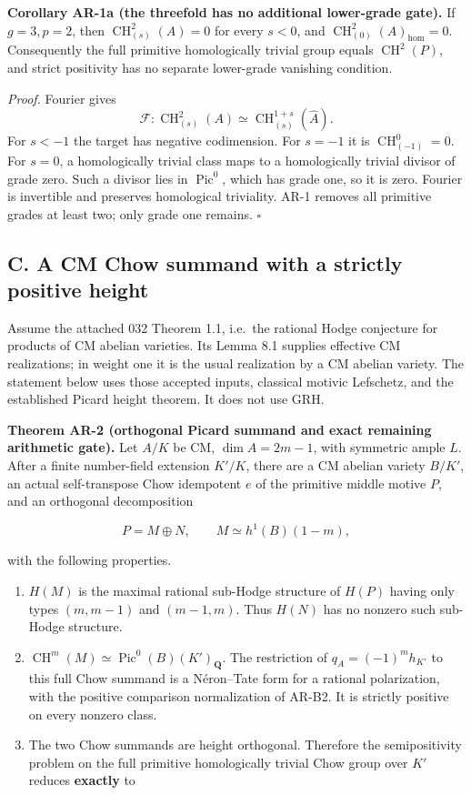 \documentclass[11pt,a4paper]{article}
\begin{document}
\textbf{Corollary AR-1a (the threefold has no additional lower-grade
gate).} If \(g=3,p=2\), then \(\operatorname{CH}^2_{(s)}(A)=0\) for
every \(s<0\), and \(\operatorname{CH}^2_{(0)}(A)_{\mathrm{hom}}=0\).
Consequently the full primitive homologically trivial group equals
\(\operatorname{CH}^2(P)\), and strict positivity has no separate
lower-grade vanishing condition.

\emph{Proof.} Fourier gives \[
\mathcal F:\operatorname{CH}^2_{(s)}(A)
 \simeq\operatorname{CH}^{1+s}_{(s)}(\widehat A).
\] For \(s<-1\) the target has negative codimension. For \(s=-1\) it is
\(\operatorname{CH}^0_{(-1)}=0\). For \(s=0\), a homologically trivial
class maps to a homologically trivial divisor of grade zero. Such a
divisor lies in \(\operatorname{Pic}^0\), which has grade one, so it is
zero. Fourier is invertible and preserves homological triviality. AR-1
removes all primitive grades at least two; only grade one remains.
\(\square\)

\subsection{C. A CM Chow summand with a strictly positive
height}\label{c.-a-cm-chow-summand-with-a-strictly-positive-height}

Assume the attached 032 Theorem 1.1, i.e.~the rational Hodge conjecture
for products of CM abelian varieties. Its Lemma 8.1 supplies effective
CM realizations; in weight one it is the usual realization by a CM
abelian variety. The statement below uses those accepted inputs,
classical motivic Lefschetz, and the established Picard height theorem.
It does not use GRH.

\textbf{Theorem AR-2 (orthogonal Picard summand and exact remaining
arithmetic gate).} Let \(A/K\) be CM, \(\dim A=2m-1\), with symmetric
ample \(L\). After a finite number-field extension \(K'/K\), there are a
CM abelian variety \(B/K'\), an actual self-transpose Chow idempotent
\(e\) of the primitive middle motive \(P\), and an orthogonal
decomposition

\[
P=M\oplus N,\qquad M\simeq h^1(B)(1-m),
\tag{AR.4}
\]

with the following properties.

\begin{enumerate}
\def\labelenumi{\arabic{enumi}.}
\tightlist
\item
  \(H(M)\) is the maximal rational sub-Hodge structure of \(H(P)\)
  having only types \((m,m-1)\) and \((m-1,m)\). Thus \(H(N)\) has no
  nonzero such sub-Hodge structure.
\item
  \(\operatorname{CH}^m(M)\simeq\operatorname{Pic}^0(B)(K')_{\mathbf Q}\).
  The restriction of \(q_A=(-1)^m h_{K'}\) to this full Chow summand is
  a Néron--Tate form for a rational polarization, with the positive
  comparison normalization of AR-B2. It is strictly positive on every
  nonzero class.
\item
  The two Chow summands are height orthogonal. Therefore the
  semipositivity problem on the full primitive homologically trivial
  Chow group over \(K'\) reduces \textbf{exactly} to
\end{enumerate}
\end{document}
